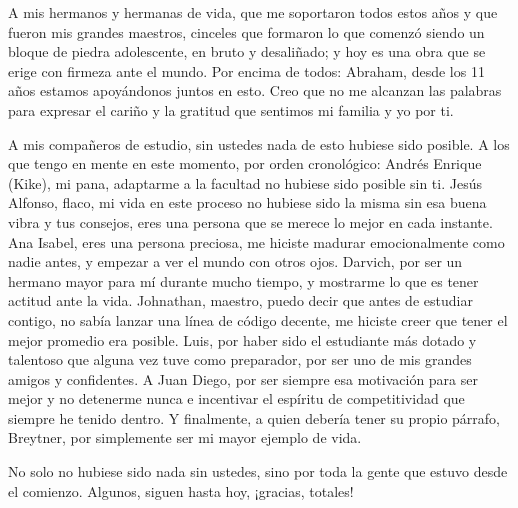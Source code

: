 \par
A mis hermanos y hermanas de vida, que me soportaron todos estos años y que fueron mis grandes maestros, cinceles que formaron lo que comenzó siendo un bloque de piedra adolescente, en bruto y desaliñado; y hoy es una obra que se erige con firmeza ante el mundo. Por encima de todos: Abraham, desde los 11 años estamos apoyándonos juntos en esto. Creo que no me alcanzan las palabras para expresar el cariño y la gratitud que sentimos mi familia y yo por ti.
\par
A mis compañeros de estudio, sin ustedes nada de esto hubiese sido posible. A los que tengo en mente en este momento, por orden cronológico: Andrés Enrique (Kike), mi pana, adaptarme a la facultad no hubiese sido posible sin ti. Jesús Alfonso, flaco, mi vida en este proceso no hubiese sido la misma sin esa buena vibra y tus consejos, eres una persona que se merece lo mejor en cada instante. Ana Isabel, eres una persona preciosa, me hiciste madurar emocionalmente como nadie antes, y empezar a ver el mundo con otros ojos. Darvich, por ser un hermano mayor para mí durante mucho tiempo, y mostrarme lo que es tener actitud ante la vida. Johnathan, maestro, puedo decir que antes de estudiar contigo, no sabía lanzar una línea de código decente, me hiciste creer que tener el mejor promedio era posible. Luis, por haber sido el estudiante más dotado y talentoso que alguna vez tuve como preparador, por ser uno de mis grandes amigos y confidentes. A Juan Diego, por ser siempre esa motivación para ser mejor y no detenerme nunca e incentivar el espíritu de competitividad que siempre he tenido dentro. Y finalmente, a quien debería tener su propio párrafo, Breytner, por simplemente ser mi mayor ejemplo de vida.
\par
No solo no hubiese sido nada sin ustedes, sino por toda la gente que estuvo desde el comienzo. Algunos, siguen hasta hoy, ¡gracias, totales!